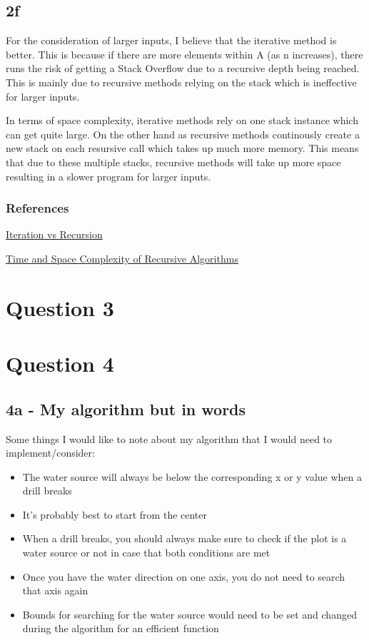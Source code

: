 \documentclass[oneside, a4paper]{article}
\begin{document}
\subsection*{2f}
For the consideration of larger inputs, I believe that the iterative method is better. This is because if there are more elements within A (as n increases), there runs the risk of getting a Stack Overflow due to a recursive depth being reached. This is mainly due to recursive methods relying on the stack which is ineffective for larger inputs.

In terms of space complexity, iterative methods rely on one stack instance which can get quite large. On the other hand as recursive methods continously create a new stack on each resursive call which takes up much more memory. This means that due to these multiple stacks, recursive methods will take up more space resulting in a slower program for larger inputs.

\subsubsection*{References}
\href{https://medium.com/backticks-tildes/iteration-vs-recursion-c2017a483890}{Iteration vs Recursion}

\href{https://www.ideserve.co.in/learn/time-and-space-complexity-of-recursive-algorithms}{Time and Space Complexity of Recursive Algorithms}

\newpage
\setcounter{secnumdepth}{-1}
\section{Question 3}

\newpage
\setcounter{secnumdepth}{-1}
\section{Question 4}
\subsection*{4a - My algorithm but in words}
Some things I would like to note about my algorithm that I would need to implement/consider:
\begin{itemize}
    \item The water source will always be below the corresponding x or y value when a drill breaks 
    \item It's probably best to start from the center
    \item When a drill breaks, you should always make sure to check if the plot is a water source or not in case that both conditions are met
    \item Once you have the water direction on one axis, you do not need to search that axis again
    \item Bounds for searching for the water source would need to be set and changed during the algorithm for an efficient function
\end{itemize}
\end{document}
